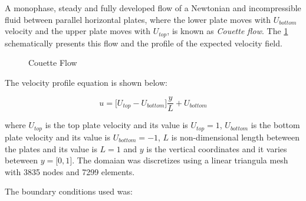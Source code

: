 A monophase, steady and fully developed flow of a 
Newtonian and incompressible fluid between parallel horizontal 
plates, where the lower plate moves with \textit{$U_{bottom}$} 
velocity and the upper plate moves with \textit{$ U_{top}$}, 
is known as \textit{Couette flow}. The \ref{couette} schematically
 presents this flow and the profile of the expected velocity field.

\begin{figure}[H]
\begin{center}
\end{center}
\caption{Couette Flow}
\label{couette}
\end{figure}


\noindent
The velocity profile equation is shown below:

\begin{equation}
 u = \big[ U_{top} - U_{bottom} \big] \frac{y}{L} + U_{bottom}
\end{equation}

\medskip
\noindent
where $U_{top}$ is the top plate velocity and its value is
$U_{top} = 1$, 
$U_{bottom}$ is the bottom plate velocity and its value is
$U_{bottom} = -1$, 
$L$ is non-dimensional length
beteween the plates and its value is $L = 1$
and $y$ is the vertical coordinates and it varies beteween 
$y = \big[ 0,1 \big]$.
The domaian was discretizes using a linear triangula mesh with 
3835 nodes and 7299 elements. 

\medskip
\noindent
The boundary conditions used was:

